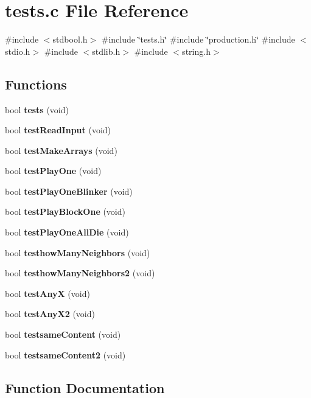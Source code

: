 \section{tests.\+c File Reference}
\label{tests_8c}
{\ttfamily \#include $<$stdbool.\+h$>$}\newline
{\ttfamily \#include \char`\"{}tests.\+h\char`\"{}}\newline
{\ttfamily \#include \char`\"{}production.\+h\char`\"{}}\newline
{\ttfamily \#include $<$stdio.\+h$>$}\newline
{\ttfamily \#include $<$stdlib.\+h$>$}\newline
{\ttfamily \#include $<$string.\+h$>$}\newline
\subsection*{Functions}
\begin{DoxyCompactItemize}
\item 
bool \textbf{ tests} (void)
\item 
bool \textbf{ test\+Read\+Input} (void)
\item 
bool \textbf{ test\+Make\+Arrays} (void)
\item 
bool \textbf{ test\+Play\+One} (void)
\item 
bool \textbf{ test\+Play\+One\+Blinker} (void)
\item 
bool \textbf{ test\+Play\+Block\+One} (void)
\item 
bool \textbf{ test\+Play\+One\+All\+Die} (void)
\item 
bool \textbf{ testhow\+Many\+Neighbors} (void)
\item 
bool \textbf{ testhow\+Many\+Neighbors2} (void)
\item 
bool \textbf{ test\+AnyX} (void)
\item 
bool \textbf{ test\+Any\+X2} (void)
\item 
bool \textbf{ testsame\+Content} (void)
\item 
bool \textbf{ testsame\+Content2} (void)
\end{DoxyCompactItemize}


\subsection{Function Documentation}
\mbox{\label{tests_8c_a9136792bde961164c06bcdde7ab1d5f5}} 
